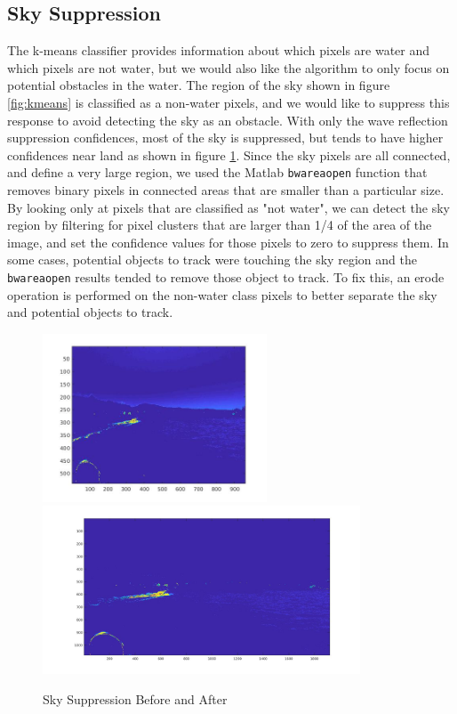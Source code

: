 \documentclass{article}
\begin{document}
\subsection{Sky Suppression}
The k-means classifier provides information about which pixels are water and
which pixels are not water, but we would also like the algorithm to only focus
on potential obstacles in the water.  The region of the sky shown in figure
\ref{fig:kmeans} is classified as a non-water pixels, and we would like to
suppress this response to avoid detecting the sky as an obstacle. With only the
wave reflection suppression confidences, most of the sky is suppressed, but
tends to have higher confidences near land as shown in figure
\ref{fig:skysuppress}.  Since the sky pixels are all connected, and define a
very large region, we used the Matlab \texttt{bwareaopen} function that removes binary
pixels in connected areas that are smaller than a particular size.  By looking
only at pixels that are classified as "not water", we can detect the sky region
by filtering for pixel clusters that are larger than 1/4 of the area of the
image, and set the confidence values for those pixels to zero to suppress them.
In some cases, potential objects to track were touching the sky region and the
\texttt{bwareaopen} results tended to remove those object to track.  To fix this, an
erode operation is performed on the non-water class pixels to better separate the sky
and potential objects to track.

\begin{figure}[H]
\includegraphics[height=5cm]{hsv_confidence}
\includegraphics[height=5cm]{hsv_kmeans2_suppressed}
\centering
\caption{Sky Suppression Before and After}
\label{fig:skysuppress}
\end{figure}
\end{document}
